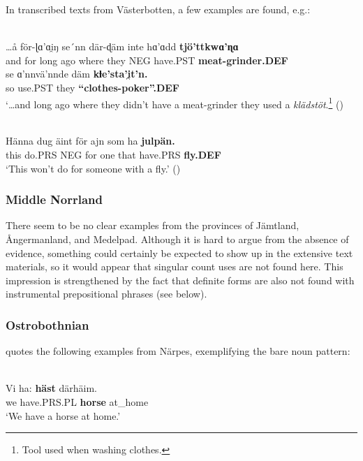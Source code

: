\z

In transcribed texts from Västerbotten, a few examples are found, e.g.:

\ea \label{} 
\\
\gll …å  för-ɭɑ’ɑi̯ŋ  se´nn  där-ɖäm  inte  hɑ’ɑdd  \textbf{tjö’ttkwɑ’ɳɑ}\\
and  for long  ago  where they  NEG  have.PST  \textbf{meat-grinder.DEF}\\
\gll se  ɑ’nnvä’nnde  däm \textbf{kƚe’sta’i̯t’n.}\\
so  use.PST  they  \textbf{“clothes-poker”.DEF}\\
\glt ‘…and long ago where they didn’t have a meat-grinder they used a \textit{klädstöt}.\footnote{ Tool used when washing clothes.} (\citet[303]{Westerberg2004})

\z

\ea \label{} 
\\
\gll Hänna  dug  äint  för  ajn  som  ha  \textbf{julpän.} \\
this  do.PRS  NEG  for  one  that  have.PRS  \textbf{fly.DEF} \\
\glt ‘This won’t do for someone with a fly.’ (\citet[94]{Westerlund1978})

\z

\subsubsection{Middle Norrland}
 There seem to be no clear examples from the provinces of Jämtland, Ångermanland, and Medelpad. Although it is hard to argue from the absence of evidence, something could certainly be expected to show up in the extensive text materials, so it would appear that singular count uses are not found here. This impression is strengthened by the fact that definite forms are also not found with instrumental prepositional phrases (see below). 

\subsubsection{Ostrobothnian}
 \citet[207]{Nikula1997} quotes the following examples from Närpes, exemplifying the bare noun pattern:

\ea\label{}
\\
\gll Vi  ha:  \textbf{häst} därhäim.\\
we  have.PRS.PL  \textbf{horse} at\_home\\
\glt ‘We have a horse at home.’

